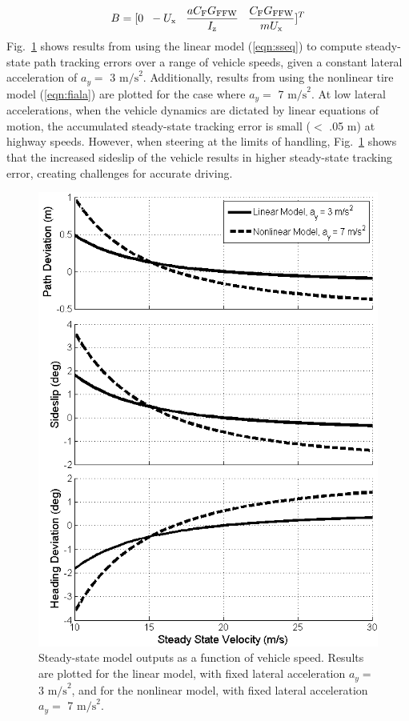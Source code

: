 \documentclass[10pt,a4paper]{article}
\begin{document}
\begin{equation}
B =[0 \hspace{2 mm} -U_\mathrm{x} \hspace{3 mm} \frac{a C_\mathrm{F} G_\mathrm{FFW}}{I_\mathrm{z}} \hspace{3 mm}  \frac{C_\mathrm{F} G_\mathrm{FFW}}{mU_\mathrm{x}}]^T
\end {equation}
Fig.~\ref{fig:linError} shows results from using the linear model (\ref{eqn:sseq}) to compute steady-state path
 tracking errors over a range of vehicle speeds, given
 a constant lateral acceleration of $a_y =$ 3 $\mathrm{m/s}^2$. Additionally, results from using the nonlinear 
 tire model (\ref{eqn:fiala}) are plotted for the case where $a_y =$ 7 $\mathrm{m/s}^2$. At low lateral accelerations, when the vehicle
 dynamics are dictated by linear equations of motion, the accumulated steady-state tracking error is small ($<$ .05 m) at highway speeds. However, 
when steering at the limits of handling, Fig.~\ref{fig:linError} shows that the increased sideslip of the vehicle results
 in higher steady-state tracking error, creating challenges for accurate driving. 

\begin{figure}[h]
\centering
\includegraphics[width=\columnwidth]{figures/LinearErrorPlot.png}
\caption{Steady-state model outputs as a function of vehicle speed. Results are plotted for the linear model, with fixed lateral acceleration $a_y = $ 3 $\mathrm{m/s}^2$, and for the
nonlinear model, with fixed lateral acceleration $a_y = $ 7 $\mathrm{m/s}^2$.}
\label{fig:linError}
\end{figure}
\end{document}
